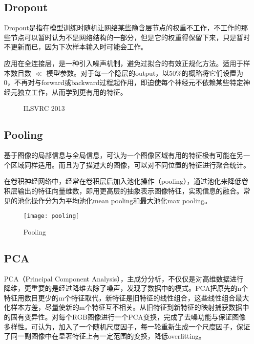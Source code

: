 \subsection{Dropout}
Dropout是指在模型训练时随机让网络某些隐含层节点的权重不工作，不工作的那些节点可以暂时认为不是网络结构的一部分，但是它的权重得保留下来，只是暂时不更新而已，因为下次样本输入时可能会工作。

应用在全连接层，是一种引入噪声机制，避免过拟合的有效正规化方法。适用于样本数目数 $\ll$ 模型参数。对于每一个隐层的output，以50\%的概略将它们设置为0，不再对与forward或backward过程起作用，即迫使每个神经元不依赖某些特定神经元独立工作，从而学到更有用的特征。
\begin{figure}[!ht]
  \centering 
  \caption{ILSVRC 2013}
\end{figure}


\subsection{Pooling}
基于图像的局部信息与全局信息，可认为一个图像区域有用的特征极有可能在另一个区域同样适用。而且为了描述大的图像，可以对不同位置的特征进行聚合统计。

在卷积神经网络中，经常在卷积层后加入池化操作（pooling），通过池化来降低卷积层输出的特征向量维数，即用更高层的抽象表示图像特征，实现信息的融合。常见的池化操作分为为平均池化mean pooling和最大池化max pooling。
\begin{figure}[!ht]
\centering
\texttt{[image: pooling]}
\caption{Pooling}
\end{figure}

\subsection{PCA}
PCA（Principal Component Analysis），主成分分析，不仅仅是对高维数据进行降维，更重要的是经过降维去除了噪声，发现了数据中的模式。PCA把原先的n个特征用数目更少的m个特征取代，新特征是旧特征的线性组合，这些线性组合最大化样本方差，尽量使新的m个特征互不相关。从旧特征到新特征的映射捕获数据中的固有变异性。对每个RGB图像进行一个PCA变换，完成了去噪功能与保证图像多样性。可认为，加入了一个随机尺度因子，每一轮重新生成一个尺度因子，保证了同一副图像中在显著特征上有一定范围的变换，降低overfitting。

